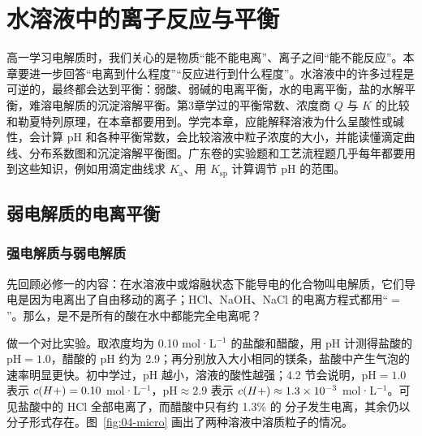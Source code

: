 \newcommand{\cfourbeaker}[2]{%
  \fill[mainblue!7] (#1,0) rectangle ++(3.4,#2);
  \draw[thick] (#1,2.9)--(#1,0)--++(3.4,0)--++(0,2.9);}

\chapter{水溶液中的离子反应与平衡}

高一学习电解质时，我们关心的是物质“能不能电离”、离子之间“能不能反应”。本章要进一步回答“电离到什么程度”“反应进行到什么程度”。水溶液中的许多过程是可逆的，最终都会达到平衡：弱酸、弱碱的电离平衡，水的电离平衡，盐的水解平衡，难溶电解质的沉淀溶解平衡。第3章学过的平衡常数、浓度商 $Q$ 与 $K$ 的比较和勒夏特列原理，在本章都要用到。学完本章，应能解释溶液为什么呈酸性或碱性，会计算 pH 和各种平衡常数，会比较溶液中粒子浓度的大小，并能读懂滴定曲线、分布系数图和沉淀溶解平衡图。广东卷的实验题和工艺流程题几乎每年都要用到这些知识，例如用滴定曲线求 $K_\text{a}$、用 $K_\text{sp}$ 计算调节 pH 的范围。

\section{弱电解质的电离平衡}

\subsection{强电解质与弱电解质}
先回顾必修一的内容：在水溶液中或熔融状态下能导电的化合物叫电解质，它们导电是因为电离出了自由移动的离子；HCl、NaOH、NaCl 的电离方程式都用“$=$”。那么，是不是所有的酸在水中都能完全电离呢？

做一个对比实验。取浓度均为 0.10 mol·L$^{-1}$ 的盐酸和醋酸，用 pH 计测得盐酸的 pH$=1.0$，醋酸的 pH 约为 2.9；再分别放入大小相同的镁条，盐酸中产生气泡的速率明显更快。初中学过，pH 越小，溶液的酸性越强；4.2 节会说明，pH$=1.0$ 表示 $c(H+)=0.10$ mol·L$^{-1}$，pH$\approx2.9$ 表示 $c(H+)\approx1.3\times10^{-3}$ mol·L$^{-1}$。可见盐酸中的 HCl 全部电离了，而醋酸中只有约 1.3\% 的  分子发生电离，其余仍以分子形式存在。图~\ref{fig:04-micro} 画出了两种溶液中溶质粒子的情况。

